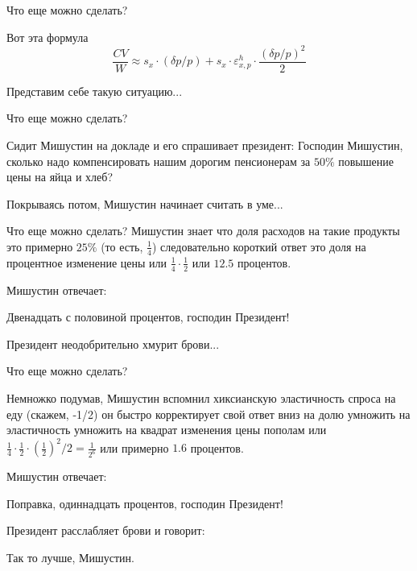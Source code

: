 \documentclass{beamer}
\begin{document}
\begin{frame}{Что еще можно сделать?}

Вот эта формула
$$\frac{CV}{W} \approx s_x \cdot (\delta p / p) + s_x \cdot \varepsilon^h_{x,p} \cdot \frac{(\delta p/p)^2}{2}$$

Представим себе такую ситуацию...
\end{frame}

\begin{frame}{Что еще можно сделать?}

Сидит Мишустин на докладе и его спрашивает президент: \alert{Господин Мишустин, сколько надо компенсировать нашим дорогим пенсионерам за $50\%$ повышение цены на яйца и хлеб?}

Покрываясь потом, Мишустин начинает считать в уме...

\end{frame}

\begin{frame}{Что еще можно сделать?}
Мишустин знает что доля расходов на такие продукты это примерно $25\%$ (то есть, $\frac{1}{4}$) следовательно короткий ответ это доля на процентное изменение цены или $\frac{1}{4} \cdot \frac{1}{2}$ или $12.5$ процентов. 

Мишустин отвечает: 

\alert{Двенадцать с половиной процентов, господин Президент!}

Президент неодобрительно хмурит брови...

\end{frame}

\begin{frame}{Что еще можно сделать?}

Немножко подумав, Мишустин вспомнил хиксианскую эластичность спроса на еду (скажем, -1/2) он быстро корректирует свой ответ вниз на долю умножить на эластичность умножить на квадрат изменения цены пополам или $\frac{1}{4} \cdot \frac{1}{2} \cdot (\frac{1}{2})^2/2 = \frac{1}{2^6}$ или примерно $1.6$ процентов.

Мишустин отвечает: 

\alert{Поправка, одиннадцать процентов, господин Президент!}

Президент расслабляет брови и говорит: 

\alert{Так то лучше, Мишустин.}

\end{frame}
\end{document}

